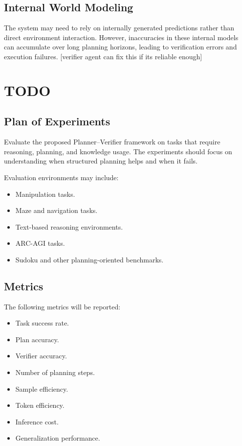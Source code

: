 \documentclass{article} %
\begin{document}
\subsection{Internal World Modeling}

The system may need to rely on internally generated predictions rather than direct environment interaction. However, inaccuracies in these internal models can accumulate over long planning horizons, leading to verification errors and execution failures. [verifier agent can fix this if its reliable enough]


\section{TODO}

\subsection{Plan of Experiments}

Evaluate the proposed Planner--Verifier framework on tasks that require reasoning, planning, and knowledge usage. The experiments should focus on understanding when structured planning helps and when it fails.

Evaluation environments may include:

\begin{itemize}
\item Manipulation tasks.
\item Maze and navigation tasks.
\item Text-based reasoning environments.
\item ARC-AGI tasks.
\item Sudoku and other planning-oriented benchmarks.
\end{itemize}

\subsection{Metrics}

The following metrics will be reported:

\begin{itemize}
\item Task success rate.
\item Plan accuracy.
\item Verifier accuracy.
\item Number of planning steps.
\item Sample efficiency.
\item Token efficiency.
\item Inference cost.
\item Generalization performance.
\end{itemize}
\end{document}
